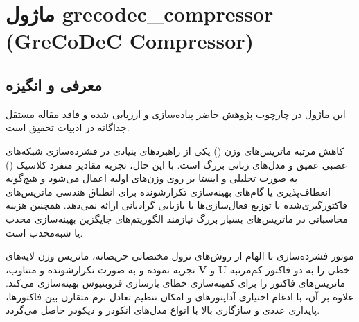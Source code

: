 \section{ماژول grecodec\_compressor (GreCoDeC Compressor)}
\label{sec:module_grecodec_compressor}

\subsection{معرفی و انگیزه}
این ماژول در چارچوب پژوهش حاضر پیاده‌سازی و ارزیابی شده و فاقد مقاله مستقل جداگانه در ادبیات تحقیق است.

کاهش مرتبه ماتریس‌های وزن () یکی از راهبردهای بنیادی در فشرده‌سازی شبکه‌های عصبی عمیق و مدل‌های زبانی بزرگ است. با این حال، تجزیه مقادیر منفرد کلاسیک () به صورت تحلیلی و ایستا بر روی وزن‌های اولیه اعمال می‌شود و هیچ‌گونه انعطاف‌پذیری یا گام‌های بهینه‌سازی تکرارشونده برای انطباق هندسی ماتریس‌های فاکتورگیری‌شده با توزیع فعال‌سازی‌ها یا بازیابی گرادیانی ارائه نمی‌دهد. همچنین هزینه محاسباتی  در ماتریس‌های بسیار بزرگ نیازمند الگوریتم‌های جایگزین بهینه‌سازی محدب یا شبه‌محدب است.

موتور فشرده‌سازی  با الهام از روش‌های نزول مختصاتی حریصانه، ماتریس وزن لایه‌های خطی را به دو فاکتور کم‌مرتبه $\mathbf{U}$ و $\mathbf{V}$ تجزیه نموده و به صورت تکرارشونده و متناوب، ماتریس‌های فاکتور را برای کمینه‌سازی خطای بازسازی فروبنیوس بهینه‌سازی می‌کند. علاوه بر آن، با ادغام اختیاری آداپتورهای  و امکان تنظیم تعادل نرم متقارن بین فاکتورها، پایداری عددی و سازگاری بالا با انواع مدل‌های انکودر و دیکودر حاصل می‌گردد.

